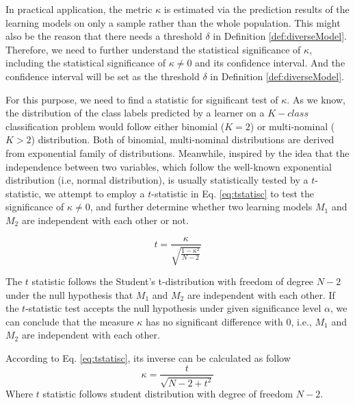 \documentclass[acmsmall]{acmart}
\begin{document}
In practical application, the metric $\kappa$ is estimated via the
prediction results of the learning models on only a sample rather
than the whole population. This might also be the reason that there
needs a threshold $\delta$ in Definition \ref{def:diverseModel}.
Therefore, we need to further understand the statistical
significance of $\kappa$, including the statistical significance of
$\kappa\neq 0$ and its confidence interval. And the confidence
interval will be set as the threshold $\delta$ in Definition
\ref{def:diverseModel}.

For this purpose, we need to find a statistic for significant test
of $\kappa$. As we know, the distribution of the class labels
predicted by a learner on a $K-class$ classification problem would
follow either binomial ($K = 2$) or multi-nominal ($K > 2$)
distribution. Both of binomial, multi-nominal distributions are
derived from exponential family of distributions. Meanwhile,
inspired by the idea that the independence between two variables,
which follow the well-known exponential distribution (i.e, normal
distribution), is usually statistically tested by a $t$-statistic,
we attempt to employ a $t$-statistic in Eq. \ref{eq:tstatisc} to
test the significance of $\kappa \neq 0$, and further determine
whether two learning models $M_1$ and $M_2$ are independent with
each other or not.

\begin{equation}\label{eq:tstatisc}
t = \frac{\kappa}{\sqrt{\frac{1-\kappa^2}{N-2}}}
\end{equation}

The $t$ statistic follows the Student's t-distribution with freedom
of degree $N-2$ under the null hypothesis that $M_1$ and $M_2$ are
independent with each other. If the $t$-statistic test accepts the
null hypothesis under given significance level $\alpha$, we can
conclude that the measure $\kappa$ has no significant difference
with 0, i.e., $M_1$ and $M_2$ are independent with each other.

According to Eq. \ref{eq:tstatisc}, its inverse can be calculated as
follow
\begin{equation}\label{eq:tinver}
\kappa = \frac{t}{\sqrt{N - 2 + t^2}}
\end{equation}
Where $t$ statistic follows student distribution with degree of
freedom $N-2$.
\end{document}
